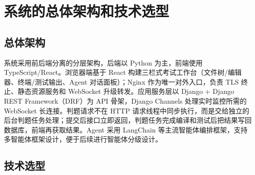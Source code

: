 \documentclass[UTF8,12pt,a4paper]{ctexart}
\begin{document}
\section{系统的总体架构和技术选型}

\subsection{总体架构}

系统采用前后端分离的分层架构，后端以 Python 为主，前端使用 TypeScript/React。浏览器端基于 React 构建三栏式考试工作台（文件树/编辑器、终端/测试输出、Agent 对话面板）；Nginx 作为唯一对外入口，负责 TLS 终止、静态资源服务和 WebSocket 升级转发。应用服务层以 Django + Django REST Framework（DRF）为 API 骨架，Django Channels 处理实时监控所需的 WebSocket 长连接。判题请求不在 HTTP 请求线程中同步执行，而是交给独立的后台判题任务处理；提交后接口立即返回，判题任务完成编译和测试后把结果写回数据库，前端再获取结果。Agent 采用 LangChain 等主流智能体编排框架，支持多智能体框架设计，便于后续进行智能体分级设计。

\subsection{技术选型}
\end{document}

